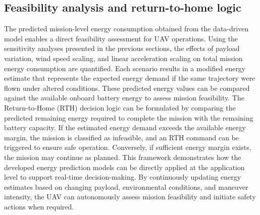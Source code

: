 \subsection{Feasibility analysis and return-to-home logic}
The predicted mission-level energy consumption obtained from the data-driven model enables a direct feasibility assessment for UAV operations. Using the sensitivity analyses presented in the previous sections, the effects of payload variation, wind speed scaling, and linear acceleration scaling on total mission energy consumption are quantified. Each scenario results in a modified energy estimate that represents the expected energy demand if the same trajectory were flown under altered conditions. These predicted energy values can be compared against the available onboard battery energy to assess mission feasibility. The Return-to-Home (RTH) decision logic can be formulated by comparing the predicted remaining energy required to complete the mission with the remaining battery capacity. If the estimated energy demand exceeds the available energy margin, the mission is classified as infeasible, and an RTH command can be triggered to ensure safe operation. Conversely, if sufficient energy margin exists, the mission may continue as planned. This framework demonstrates how the developed energy prediction models can be directly applied at the application level to support real-time decision-making. By continuously updating energy estimates based on changing payload, environmental conditions, and maneuver intensity, the UAV can autonomously assess mission feasibility and initiate safety actions when required.
